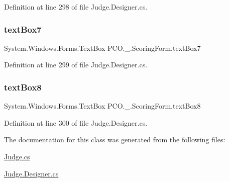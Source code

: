Definition at line 298 of file Judge.\+Designer.\+cs.

\mbox{\label{classPCO_1_1__0_1_1ScoringForm_a743b9df795f09a7afac4f252981cec70}} 
\subsubsection{\texorpdfstring{text\+Box7}{textBox7}}
{\footnotesize\ttfamily System.\+Windows.\+Forms.\+Text\+Box P\+C\+O.\+\_.\+Scoring\+Form.\+text\+Box7\hspace{0.3cm}{\ttfamily [private]}}



Definition at line 299 of file Judge.\+Designer.\+cs.

\mbox{\label{classPCO_1_1__0_1_1ScoringForm_a1bdd53f49a48c5ce09d4f63365b7ecf4}} 
\subsubsection{\texorpdfstring{text\+Box8}{textBox8}}
{\footnotesize\ttfamily System.\+Windows.\+Forms.\+Text\+Box P\+C\+O.\+\_.\+Scoring\+Form.\+text\+Box8\hspace{0.3cm}{\ttfamily [private]}}



Definition at line 300 of file Judge.\+Designer.\+cs.



The documentation for this class was generated from the following files\+:\begin{DoxyCompactItemize}
\item 
\hyperlink{Judge_8cs}{Judge.\+cs}\item 
\hyperlink{Judge_8Designer_8cs}{Judge.\+Designer.\+cs}\end{DoxyCompactItemize}

